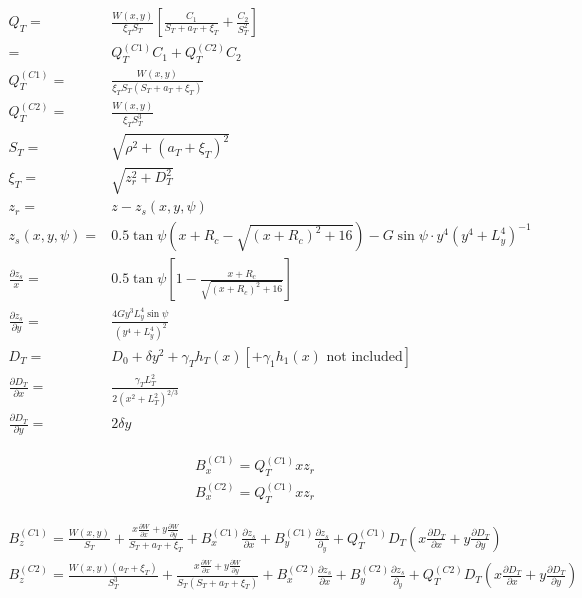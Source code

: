 \documentclass[]{article}
\begin{document}
		\begin{align}
			Q_T =& \frac{W(x,y)}{\xi_T S_T}\left[\frac{C_1}{S_T + a_T + \xi_T} + \frac{C_2}{S_T^2} \right] \\
			=& Q_T^{(C1)} C_1 + Q_T^{(C2)} C_2 \\
			Q_T^{(C1)} =& \frac{W(x,y)}{\xi_T S_T(S_T + a_T + \xi_T)} \\
			Q_T^{(C2)} =& \frac{W(x,y)}{\xi_T S_T^3} \\
			S_T =& \sqrt{\rho^2 + (a_T + \xi_T)^2} \\
			\xi_T =& \sqrt{z_r^2 + D_T^2} \\
			z_r =& z - z_s(x,y,\psi) \\
			z_s(x,y,\psi) =& 0.5\tan{\psi}(x + R_c - \sqrt{(x + R_c)^2 + 16}) - G\sin{\psi}\cdot y^4(y^4 + L_y^4)^{-1} \\
			\frac{\partial z_s}{x} =& 0.5\tan{\psi}\left[1 - \frac{x + R_c}{\sqrt{(x + R_c)^2 + 16}}\right] \\
			\frac{\partial z_s}{\partial y} =& \frac{4 G y^3L_y^4\sin{\psi}}{(y^4 + L_y^4)^2} \\
			D_T =& D_0 + \delta y^2+ \gamma_T h_T(x) [ + \gamma_1 h_1(x) \text{ not included}] \\
			\frac{\partial D_T}{\partial x} =& \frac{\gamma_T L_T^2}{2(x^2 + L_T^2)^{2/3}} \\
			\frac{\partial D_T}{\partial y} =& 2 \delta y
		\end{align}
	
		\begin{align}
			B_x^{(C1)} = Q_T^{(C1)} x z_r \\
			B_x^{(C2)} = Q_T^{(C1)} x z_r 
		\end{align}
	
		\begin{align}
			B_z^{(C1)} = \frac{W(x,y)}{S_T} + \frac{x\frac{\partial W}{\partial x} + y\frac{\partial W}{\partial y}}{S_T + a_T + \xi_T} + B_x^{(C1)}\frac{\partial z_s}{\partial x} + B_y^{(C1)} \frac{\partial z_s}{\partial _y} + Q_T^{(C1)} D_T\left( x\frac{\partial D_T}{\partial x} + y\frac{\partial D_T}{\partial y}\right) \\
			B_z^{(C2)} = \frac{W(x,y)(a_T + \xi_T)}{S_T^3} + \frac{x\frac{\partial W}{\partial x} + y\frac{\partial W}{\partial y}}{S_T(S_T + a_T + \xi_T)} + B_x^{(C2)}\frac{\partial z_s}{\partial x} + B_y^{(C2)} \frac{\partial z_s}{\partial _y} + Q_T^{(C2)} D_T\left( x\frac{\partial D_T}{\partial x} + y\frac{\partial D_T}{\partial y}\right)
		\end{align}
	






\end{document}
